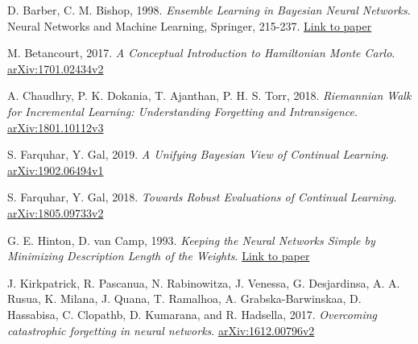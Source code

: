 \documentclass[a4paper,11=0pt]{article}
\begin{document}




\begin{thebibliography}{8}

 D. Barber, C. M. Bishop, 1998. \textit{Ensemble Learning in Bayesian Neural Networks}. Neural Networks and Machine Learning, Springer, 215-237. \href{https://www.microsoft.com/en-us/research/wp-content/uploads/2016/02/bishop-ensemble-nato-98.pdf}{Link to paper}

 M. Betancourt, 2017. \textit{A Conceptual Introduction to Hamiltonian Monte Carlo}. \href{https://arxiv.org/abs/1701.02434}{arXiv:1701.02434v2}

 A. Chaudhry, P. K. Dokania, T. Ajanthan, P. H. S. Torr, 2018. \textit{Riemannian Walk for Incremental Learning: Understanding Forgetting and Intransigence}. \href{https://arxiv.org/abs/1801.10112}{arXiv:1801.10112v3}

 S. Farquhar, Y. Gal, 2019. \textit{A Unifying Bayesian View of Continual Learning}. \href{https://arxiv.org/abs/1902.06494}{arXiv:1902.06494v1}

 S. Farquhar, Y. Gal, 2018. \textit{Towards Robust Evaluations of Continual Learning}. \href{https://arxiv.org/abs/1805.09733}{arXiv:1805.09733v2}

 G. E. Hinton, D. van Camp, 1993. \textit{Keeping the
Neural Networks Simple by Minimizing Description Length of the Weights}. \href{http://www.cs.toronto.edu/~fritz/absps/colt93.pdf}{Link to paper}

 J. Kirkpatrick, R. Pascanua, N. Rabinowitza, J. Venessa, G. Desjardinsa, A. A. Rusua, K. Milana, J. Quana, T. Ramalhoa, A. Grabska-Barwinskaa, D. Hassabisa, C. Clopathb, D. Kumarana, and R. Hadsella, 2017. \textit{Overcoming catastrophic forgetting in neural networks}. \href{https://arxiv.org/abs/1612.00796}{arXiv:1612.00796v2}


\end{thebibliography}
\end{document}
